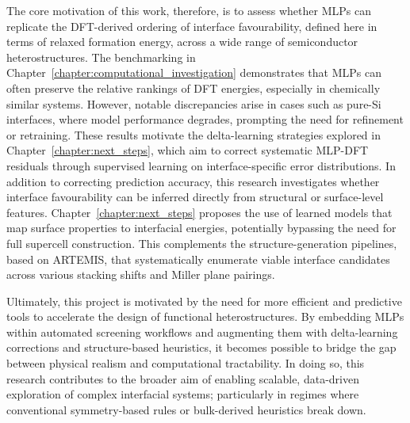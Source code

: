 The core motivation of this work, therefore, is to assess whether MLPs can replicate the DFT-derived ordering of interface favourability, defined here in terms of relaxed formation energy, across a wide range of semiconductor heterostructures. The benchmarking in Chapter~\ref{chapter:computational_investigation} demonstrates that MLPs can often preserve the relative rankings of DFT energies, especially in chemically similar systems. However, notable discrepancies arise in cases such as pure-Si interfaces, where model performance degrades, prompting the need for refinement or retraining. These results motivate the delta-learning strategies explored in Chapter~\ref{chapter:next_steps}, which aim to correct systematic MLP-DFT residuals through supervised learning on interface-specific error distributions.
In addition to correcting prediction accuracy, this research investigates whether interface favourability can be inferred directly from structural or surface-level features. Chapter~\ref{chapter:next_steps} proposes the use of learned models that map surface properties to interfacial energies, potentially bypassing the need for full supercell construction. This complements the structure-generation pipelines, based on ARTEMIS, that systematically enumerate viable interface candidates across various stacking shifts and Miller plane pairings.

Ultimately, this project is motivated by the need for more efficient and predictive tools to accelerate the design of functional heterostructures. By embedding MLPs within automated screening workflows and augmenting them with delta-learning corrections and structure-based heuristics, it becomes possible to bridge the gap between physical realism and computational tractability. In doing so, this research contributes to the broader aim of enabling scalable, data-driven exploration of complex interfacial systems; particularly in regimes where conventional symmetry-based rules or bulk-derived heuristics break down.

